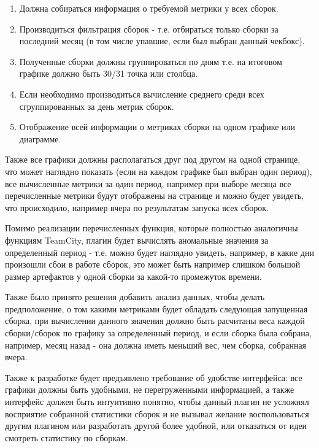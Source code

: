 \begin{enumerate}
	\item Должна собираться информация о требуемой метрики у всех сборок.
	
	\item Производиться фильтрация сборок - т.е. отбираться только сборки за последний месяц (в том числе упавшие, если был выбран данный чекбокс).
	
	\item Полученные сборки должны группироваться по дням т.е. на итоговом графике должно быть 30/31 точка или столбца.
	
	\item Если необходимо производиться вычисление среднего среди всех сгруппированных за день метрик сборок.
	
	\item Отображение всей информации о метриках сборки на одном графике или диаграмме.
	
	
\end{enumerate}

Также все графики должны располагаться друг под другом на одной странице, что может наглядно показать (если на каждом графике был выбран один период), все вычисленные метрики за один период, например при выборе месяца все перечисленные метрики будут отображены на странице и можно будет увидеть, что происходило, например вчера по результатам запуска всех сборок.

Помимо реализации перечисленных функция, которые полностью аналогичны функциям TeamCity, плагин будет вычислять аномальные значения за определенный период - т.е. можно будет наглядно увидеть, например, в какие дни произошли сбои в работе сборок, это может быть например слишком большой размер артефактов у одной сборки за какой-то промежуток времени.

Также было принято решения добавить анализ данных, чтобы делать предположение, о том какими метриками будет обладать следующая запущенная сборка, при вычислении данного значения должно быть расчитаны веса каждой сборки/сборок по графику за определенный период, и если сборка была собрана, например, месяц назад - она должна иметь меньший вес, чем сборка, собранная вчера.

Также к разработке будет предъявлено требование об удобстве интерфейса: все графики должны быть удобными, не перегруженными информацией, а также интерфейс должен быть интуитивно понятно, чтобы данный плагин не усложнял восприятие собранной статистики сборок и не вызывал желание воспользоваться другим плагином или разработать другой более удобной, или отказаться от идеи смотреть статистику по сборкам.

